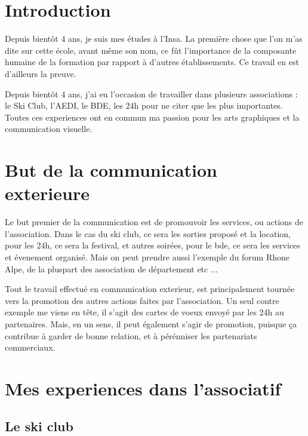 
\section {Introduction}

    Depuis bientôt 4 ans, je suis mes études à l'Insa.
    La première chose que l'on m'as dite sur cette école, avant même son nom, ce fût l'importance de la composante humaine de la formation par rapport à d'autres établissements. Ce travail en est d'ailleurs la preuve.

    Depuis bientôt 4 ans, j'ai eu l'occasion de travailler dans plusieurs associations : le Ski Club, l'AEDI, le BDE, les 24h pour ne citer que les plus importantes.
    Toutes ces experiences ont en commun ma passion pour les arts graphiques et la communication visuelle.

        
    
\section{But de la communication exterieure}

Le but premier de la communication est de promouvoir les services, ou actions de l'association.
Dans le cas du ski club, ce sera les sorties proposé et la location, pour les 24h, ce sera la festival, et autres soirées, pour le bde, ce sera les services et évenement organisé.
Mais on peut prendre aussi l'exemple du forum Rhone Alpe, de la pluspart des association de département etc ...

Tout le travail effectué en communication exterieur, est principalement tournée vers la promotion des autres actions faites par l'association.
Un seul contre exemple me viens en tête, il s'agit des cartes de voeux envoyé par les 24h au partenaires.
Mais, en un sens, il peut également s'agir de promotion, puisque ça contribue à garder de bonne relation, et à pérénniser les partenariats commerciaux.


\section{Mes experiences dans l'associatif}

    \subsection{Le ski club}
        

